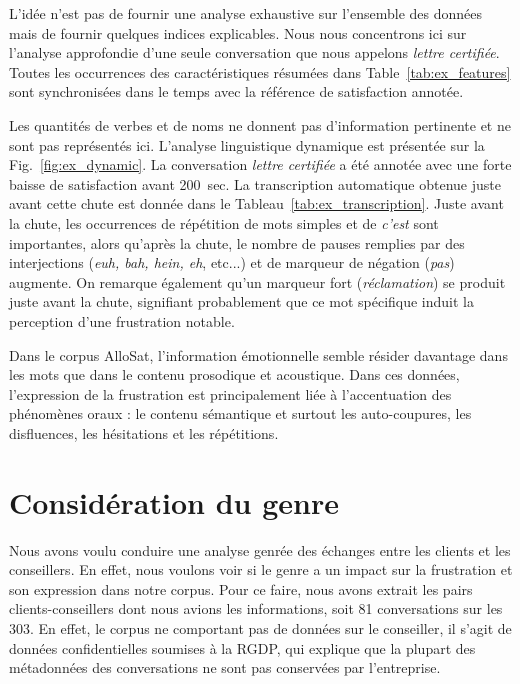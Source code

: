 

L'idée n'est pas de fournir une analyse exhaustive sur l'ensemble des données mais de fournir quelques indices explicables. Nous nous concentrons ici sur l'analyse approfondie d'une seule conversation que nous appelons \textit{lettre certifiée}. Toutes les occurrences des caractéristiques résumées dans Table~\ref{tab:ex_features} sont synchronisées dans le temps avec la référence de satisfaction annotée.



Les quantités de verbes et de noms ne donnent pas d'information pertinente et ne sont pas représentés ici. L'analyse linguistique dynamique est présentée sur la Fig.~\ref{fig:ex_dynamic}. La conversation \textit{lettre certifiée} a été annotée avec une forte baisse de satisfaction avant 200~sec. La transcription automatique obtenue juste avant cette chute est donnée dans le Tableau~\ref{tab:ex_transcription}. Juste avant la chute, les occurrences de répétition de mots simples et de \textit{c'est} sont importantes, alors qu'après la chute, le nombre de pauses remplies par des interjections (\textit{euh, bah, hein, eh}, etc...) et de marqueur de négation (\textit{pas}) augmente. On remarque également qu'un marqueur fort (\textit{réclamation}) se produit juste avant la chute, signifiant probablement que ce mot spécifique induit la perception d'une frustration notable.



Dans le corpus AlloSat, l'information émotionnelle semble résider davantage dans les mots que dans le contenu prosodique et acoustique. Dans ces données, l'expression de la frustration est principalement liée à l'accentuation des phénomènes oraux : le contenu sémantique et surtout les auto-coupures, les disfluences, les hésitations et les répétitions.

\section{Considération du genre}
Nous avons voulu conduire une analyse genrée des échanges entre les clients et les conseillers. En effet, nous voulons voir si le genre a un impact sur la frustration et son expression dans notre corpus. Pour ce faire, nous avons extrait les pairs clients-conseillers dont nous avions les informations, soit 81 conversations sur les 303. En effet, le corpus ne comportant pas de données sur le conseiller, il s'agit de données confidentielles soumises à la RGDP, qui explique que la plupart des métadonnées des conversations ne sont pas conservées par l'entreprise.

